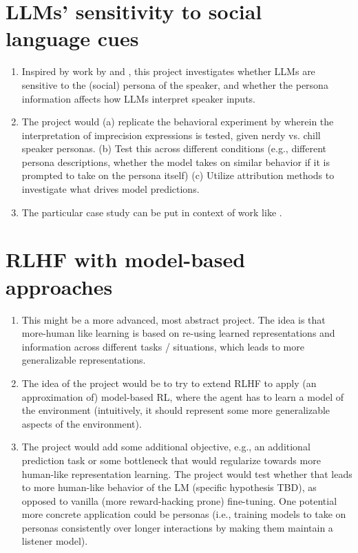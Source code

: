 \documentclass[fleqn,reqno,10pt]{article}
\begin{document}
\section{LLMs' sensitivity to social language cues}
\begin{enumerate}
	\item Inspired by work by \citet{burnett2019signalling} and \citet{beltrama2021imprecision}, this project investigates whether LLMs are sensitive to the (social) persona of the speaker, and whether the persona information affects how LLMs interpret speaker inputs.  
	\item The project would (a) replicate the behavioral experiment by \citet{beltrama2021imprecision} wherein the interpretation of imprecision expressions is tested, given nerdy vs. chill speaker personas. (b) Test this across different conditions (e.g., different persona descriptions, whether the model takes on similar behavior if it is prompted to take on the persona itself) (c) Utilize attribution methods to investigate what drives model predictions.
	\item The particular case study can be put in context of work like \citet{liu2024largelanguagemodelsnavigate}.
\end{enumerate}

\section{RLHF with model-based approaches}
\begin{enumerate}
	\item This might be a more advanced, most abstract project. The idea is that more-human like learning is based on re-using learned representations and information across different tasks / situations, which leads to more generalizable representations. 
	\item The idea of the project would be to try to extend RLHF to apply (an approximation of) model-based RL, where the agent has to learn a model of the environment (intuitively, it should represent some more generalizable aspects of the environment). 
	\item The project would add some additional objective, e.g., an additional prediction task or some bottleneck that would regularize towards more human-like representation learning. The project would test whether that leads to more human-like behavior of the LM (specific hypothesis TBD), as opposed to vanilla (more reward-hacking prone) fine-tuning.  One potential more concrete application could be personas (i.e., training models to take on personas consistently over longer interactions by making them maintain a listener model).
\end{enumerate}

\printbibliography[heading=bibintoc]
\end{document}
